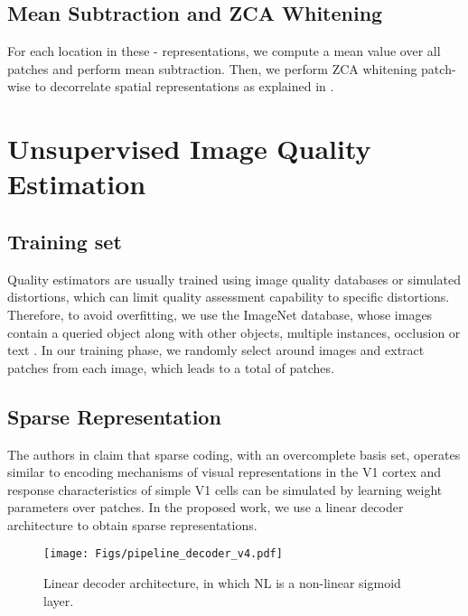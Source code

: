 \documentclass[draftcls,12pt, onecolumn]{IEEEtran}
\begin{document}
\subsection{Mean Subtraction and ZCA Whitening}
For each location in these - representations, we compute a mean value over all patches and perform mean subtraction. Then, we perform ZCA whitening patch-wise to decorrelate spatial representations as explained in \cite{chang2012}. 
\vspace{-2.0mm}

\section{Unsupervised Image Quality Estimation}

\vspace{-1.0mm}

\subsection{Training set}
\vspace{-1.0mm}
Quality estimators are usually trained using image quality databases or simulated distortions, which can limit quality assessment capability to specific distortions. Therefore, to avoid overfitting, we use the ImageNet database, whose images contain a queried object along with other objects, multiple instances, occlusion or text \cite{ImageNet_VSS09}. In our training phase, we randomly select around  images and  extract  patches from each image, which leads to a total of  patches.
\vspace{-3.5mm}

\subsection{Sparse Representation}
\vspace{-1.0mm}
The authors in \cite{olshausen1997sparse} claim that sparse coding, with an overcomplete basis set, operates similar to encoding mechanisms of visual representations in the V1 cortex and response characteristics of simple V1 cells can be simulated by learning weight parameters over patches. In the proposed work, we use a linear decoder architecture to obtain sparse representations.



\begin{figure}[htbp!]
	\begin{center}
		\noindent
		\texttt{[image: Figs/pipeline\_decoder\_v4.pdf]}
		\vspace{-1.5mm}
	    \caption{Linear decoder architecture, in which NL is a non-linear sigmoid layer.}
		\vspace{-7.0mm}
		\label{fig:decoder}
	\end{center}
\end{figure}
\end{document}

